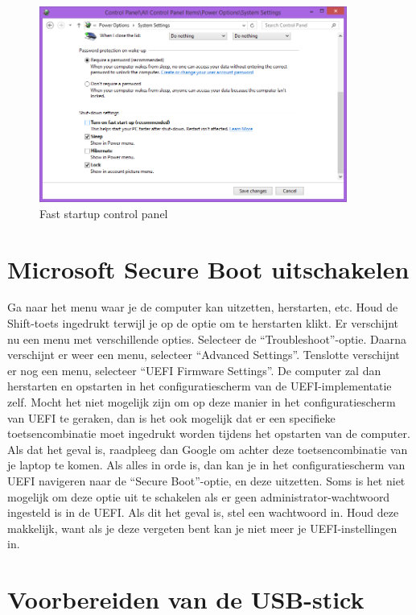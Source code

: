 \documentclass[10pt,a4paper]{article}
\begin{document}
\begin{figure}[t]
\includegraphics[width=0.9\textwidth]{fast-startup}
\caption{Fast startup control panel}
\label{img:fast}
\end{figure}

\section{Microsoft Secure Boot uitschakelen}

Ga naar het menu waar je de computer kan uitzetten, herstarten, etc.
Houd de Shift-toets ingedrukt terwijl je op de optie om te herstarten klikt.
Er verschijnt nu een menu met verschillende opties.
Selecteer de ``Troubleshoot''-optie.
Daarna verschijnt er weer een menu, selecteer ``Advanced Settings''.
Tenslotte verschijnt er nog een menu, selecteer ``UEFI Firmware Settings''.
De computer zal dan herstarten en opstarten in het configuratiescherm van de UEFI-implementatie zelf.
Mocht het niet mogelijk zijn om op deze manier in het configuratiescherm van UEFI te geraken,
dan is het ook mogelijk dat er een specifieke toetsencombinatie moet ingedrukt worden
tijdens het opstarten van de computer. Als dat het geval is, raadpleeg dan Google om achter deze
toetsencombinatie van je laptop te komen.
Als alles in orde is, dan kan je in het configuratiescherm van UEFI navigeren
naar de ``Secure Boot''-optie, en deze uitzetten. Soms is het niet mogelijk om deze optie
uit te schakelen als er geen administrator-wachtwoord ingesteld is in de UEFI. Als dit het geval is, stel een wachtwoord in. Houd deze makkelijk, want als je deze vergeten bent kan je niet meer je UEFI-instellingen in.

\section{Voorbereiden van de USB-stick}
\end{document}
